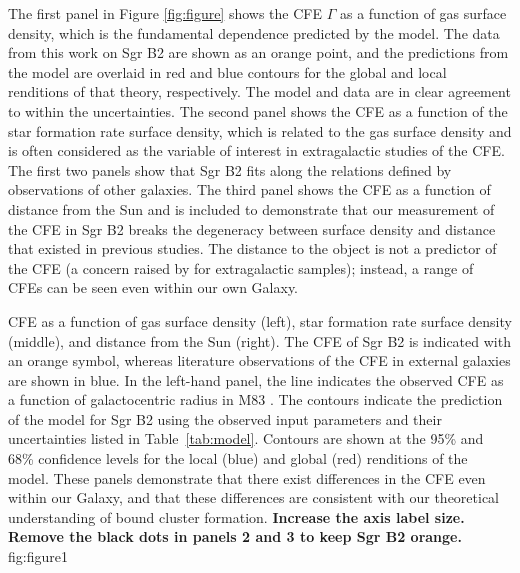 \documentclass[twocolumn]{aastex62}
\begin{document}
The first panel in Figure \ref{fig:figure} shows the CFE $\Gamma$ as a function
of gas surface density, which is the fundamental dependence predicted by the model. The data from this work on Sgr B2 are shown as an orange point, and the predictions from the \citet{Kruijssen2012a} model are overlaid in red and blue contours for the global and local renditions of that theory, respectively. The model and data are in clear agreement to within the uncertainties. The second panel shows the CFE as a function of the star formation rate surface density, which is related to the gas surface density \citep[e.g.][]{Kennicutt1998a,Bigiel2008a,Leroy2013a} and is often considered as the variable of interest in extragalactic studies of the CFE. The first two panels show that Sgr B2 fits along the relations defined by observations of other galaxies. The third panel shows the CFE as a function of distance from the Sun and is included to demonstrate that our measurement of the CFE in Sgr B2 breaks the degeneracy between surface density and distance that existed in previous studies. The distance to the object is not a predictor of the CFE (a concern raised by \citealt{Adamo2011a} for extragalactic samples); instead, a range of CFEs can be seen even within our own Galaxy.

{CFE as a function of gas surface density (left), star formation rate surface density (middle), and distance from the Sun (right). The CFE of Sgr B2 is indicated with an orange symbol, whereas literature observations of the CFE in external galaxies are shown in blue. In the left-hand panel, the line indicates the observed CFE as a function of galactocentric radius in M83 \citep{Adamo2015a}. The contours indicate the prediction of the \citet{Kruijssen2012a} model for Sgr B2 using the observed input parameters and their uncertainties listed in Table~\ref{tab:model}. Contours are shown at the 95\% and 68\% confidence levels for the local (blue) and global (red) renditions of the model. These panels demonstrate that there exist differences in the CFE even within our Galaxy, and that these differences are consistent with our theoretical understanding of bound cluster formation. {\bf Increase the axis label size. Remove the black dots in panels 2 and 3 to keep Sgr B2 orange.}
}
{fig:figure}{1}{\textwidth}
\end{document}
